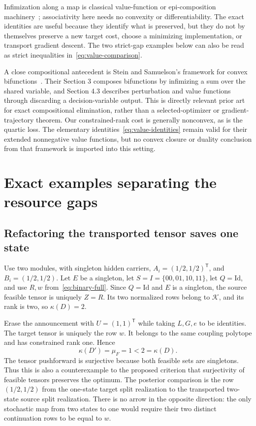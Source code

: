 \documentclass[11pt]{article}
\newcommand{\Id}{\mathrm{Id}}
\newcommand{\Kcal}{\mathcal K}
\theoremstyle{remark}
\begin{document}
Infimization along a map is classical value-function or epi-composition machinery~\cite[Eq.~1(17)]{RockafellarWets}; associativity here needs no convexity or differentiability. The exact identities are useful because they identify what is preserved, but they do not by themselves preserve a new target cost, choose a minimizing implementation, or transport gradient descent. The two strict-gap examples below can also be read as strict inequalities in~\eqref{eq:value-comparison}.

A close compositional antecedent is Stein and Samuelson's framework for convex bifunctions~\cite{SteinSamuelson}. Their Section 3 composes bifunctions by infimizing a sum over the shared variable, and Section 4.3 describes perturbation and value functions through discarding a decision-variable output. This is directly relevant prior art for exact compositional elimination, rather than a selected-optimizer or gradient-trajectory theorem. Our constrained-rank cost is generally nonconvex, as is the quartic loss. The elementary identities~\eqref{eq:value-identities} remain valid for their extended nonnegative value functions, but no convex closure or duality conclusion from that framework is imported into this setting.


\section{Exact examples separating the resource gaps}\label{sec:examples}
\subsection{Refactoring the transported tensor saves one state}
Use two modules, with singleton hidden carriers, $A_i=(1/2,1/2)^{\mathsf T}$, and $B_i=(1/2,1/2)$. Let $E$ be a singleton, let $S=I=\{00,01,10,11\}$, let $Q=\Id$, and use $R,w$ from~\eqref{eq:binary-full}. Since $Q=\Id$ and $E$ is a singleton, the source feasible tensor is uniquely $Z=R$. Its two normalized rows belong to $\Kcal$, and its rank is two, so $\kappa(D)=2$.

Erase the announcement with $U=(1,1)^{\mathsf T}$ while taking $L,G,e$ to be identities. The target tensor is uniquely the row $w$. It belongs to the same coupling polytope and has constrained rank one. Hence
\[
 \kappa(D')=\mu_F=1<2=\kappa(D).
\]
The tensor pushforward is surjective because both feasible sets are singletons. Thus this is also a counterexample to the proposed criterion that surjectivity of feasible tensors preserves the optimum. The posterior comparison is the row $(1/2,1/2)$ from the one-state target split realization to the transported two-state source split realization. There is no arrow in the opposite direction: the only stochastic map from two states to one would require their two distinct continuation rows to be equal to $w$.
\end{document}
